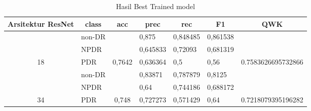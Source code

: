     \begin{table}[hbtp]
        \begin{center}
        \caption{Hasil Best Trained model}
        \label{tb:HasilTrainDefault}
        \begin{tabular}{|c|l|c|l|l|l|c|}
        \hline
        \rowcolor[HTML]{C0C0C0} 
        Arsitektur ResNet   & \multicolumn{1}{c|}{\cellcolor[HTML]{C0C0C0}class} & acc                      & \multicolumn{1}{c|}{\cellcolor[HTML]{C0C0C0}prec} & \multicolumn{1}{c|}{\cellcolor[HTML]{C0C0C0}rec} & \multicolumn{1}{c|}{\cellcolor[HTML]{C0C0C0}F1} & QWK                                  \\ \hline
                              & non-DR                                             &                          & 0,875                                             & 0,848485                                         & 0,861538                                        &                                      \\ \cline{2-2} \cline{4-6}
                              & NPDR                                               &                          & 0,645833                                          & 0,72093                                          & 0,681319                                        &                                      \\ \cline{2-2} \cline{4-6}
        \multirow{-3}{*}{18}  & PDR                                                & \multirow{-3}{*}{0,7642} & 0,636364                                          & 0,5                                              & 0,56                                            & \multirow{-3}{*}{0.7583626695732866} \\ \hline
                              & non-DR                                             &                          & 0,83871                                           & 0,787879                                         & 0,8125                                          &                                      \\ \cline{2-2} \cline{4-6}
                              & NPDR                                               &                          & 0,64                                              & 0,744186                                         & 0,688172                                        &                                      \\ \cline{2-2} \cline{4-6}
        \multirow{-3}{*}{34}  & PDR                                                & \multirow{-3}{*}{0,748}  & 0,727273                                          & 0,571429                                         & 0,64                                            & \multirow{-3}{*}{0.7218079395196282} \\ \hline

\end{tabular}
\end{center}
\end{table}
